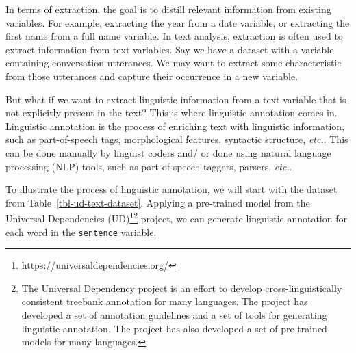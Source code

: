 \documentclass[
  letterpaper,
]{latex/krantz}
\theoremstyle{definition}
\theoremstyle{remark}
\DeclareRobustCommand{\href}[2]{#2\footnote{\url{#1}}}
\begin{document}
In terms of extraction, the goal is to distill relevant information from
existing variables. For example, extracting the year from a date
variable, or extracting the first name from a full name variable. In
text analysis, extraction is often used to extract information from text
variables. Say we have a dataset with a variable containing conversation
utterances. We may want to extract some characteristic from those
utterances and capture their occurrence in a new variable.

But what if we want to extract linguistic information from a text
variable that is not explicitly present in the text? This is where
linguistic annotation comes in. Linguistic annotation is the process of
enriching text with linguistic information, such as part-of-speech tags,
morphological features, syntactic structure, \emph{etc.}. This can be
done manually by linguist coders and/ or done using natural language
processing (NLP) tools, such as part-of-speech taggers, parsers,
\emph{etc.}.

To illustrate the process of linguistic annotation, we will start with
the dataset from Table~\ref{tbl-ud-text-dataset}. Applying a pre-trained
model from the \href{https://universaldependencies.org/}{Universal
Dependencies (UD)}\footnote{The Universal Dependency project is an
  effort to develop cross-linguistically consistent treebank annotation
  for many languages. The project has developed a set of annotation
  guidelines and a set of tools for generating linguistic annotation.
  The project has also developed a set of pre-trained models for many
  languages.} project, we can generate linguistic annotation for each
word in the \texttt{sentence} variable.
\end{document}

